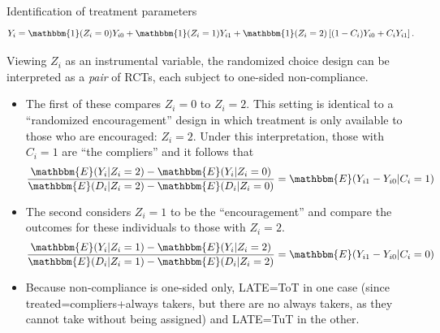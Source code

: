 \documentclass[8pt]{beamer}
\begin{document}
 
 
\begin{frame}{Identification of treatment parameters}
\label{identification_randomized_choice}
\begin{equation*}
    Y_i = \mathbbm{1}(Z_i =0) Y_{i0} + \mathbbm{1}(Z_i = 1)  Y_{i1}  + \mathbbm{1}(Z_i = 2) \left[(1 - C_i) Y_{i0} + C_i Y_{i1} \right].
\label{eq:potentialOutcomes}
\end{equation*}

    Viewing $Z_i$ as an instrumental variable, the randomized choice design can be interpreted as a \emph{pair} of RCTs, each subject to one-sided non-compliance. \\
    \begin{itemize}
        \item The first of these compares $Z_i=0$ to $Z_i = 2$.  This setting is identical to a ``randomized encouragement'' design in which treatment is only available to those who are encouraged: $Z_i = 2$. Under this interpretation, those with $C_i = 1$ are ``the compliers'' and it follows that 
\begin{equation*}
\frac{\mathbbm{E}(Y_i|Z_i=2) - \mathbbm{E}(Y_i|Z_i =0)}{\mathbbm{E}(D_i|Z_i=2)-\mathbbm{E}(D_i|Z_i=0)}  = \mathbbm{E}(Y_{i1} - Y_{i0}|C_i = 1)
\label{eq:ToT}
\end{equation*}

\item The second considers $Z_i = 1$ to be the ``encouragement'' and compare the outcomes for these individuals to those with $Z_i = 2$.
\begin{equation*}
\frac{\mathbbm{E}(Y_i|Z_i=1) - \mathbbm{E}(Y_i|Z_i =2)}{\mathbbm{E}(D_i|Z_i=1)-\mathbbm{E}(D_i|Z_i=2)}  = \mathbbm{E}(Y_{i1} - Y_{i0} | C_i = 0)
\label{eq:TuT}
\end{equation*}


\item Because non-compliance is one-sided only, LATE=ToT in one case (since treated=compliers+always takers, but there are no always takers, as they cannot take without being assigned) and LATE=TuT in the other.

\end{itemize}
\hyperlink{cc_design}{}


\end{frame}
\end{document}
